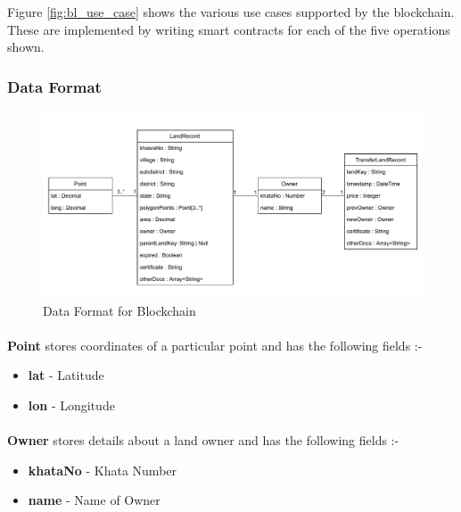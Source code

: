 \documentclass{article}
\begin{document}
        Figure \ref{fig:bl_use_case} shows the various use cases supported by the blockchain. These are implemented by writing smart contracts for each of the five operations shown.

        \subsubsection{Data Format}
            \begin{figure}[htbp]
                \includegraphics[scale=0.25]{blockchain_data_format}
                \centering
                \caption{Data Format for Blockchain}
            \end{figure}

        \paragraph{}
        \textbf{Point} stores coordinates of a particular point and has the following fields :-
        \begin{itemize}
            \item \textbf{lat} - Latitude
            \item \textbf{lon} - Longitude
        \end{itemize}

        \paragraph{}
        \textbf{Owner} stores details about a land owner and has the following fields :-
        \begin{itemize}
            \item \textbf{khataNo} - Khata Number
            \item \textbf{name} - Name of Owner
        \end{itemize}
\end{document}
